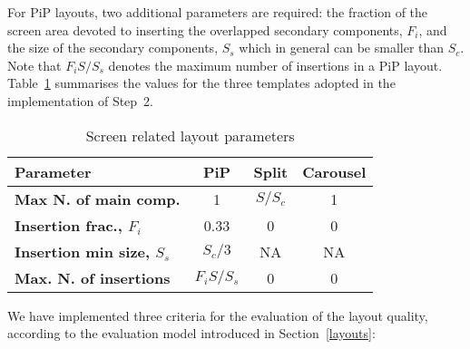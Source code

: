 For PiP layouts, two additional parameters are required: the fraction of the screen area devoted to inserting the overlapped secondary components, $F_i$, and the size of the secondary components, $S_s$ which in general can be smaller than $S_c$.
Note that $F_iS/S_s$ denotes the maximum number of insertions in a PiP layout. 
Table~\ref{tab:layoutparam} summarises the values for the three templates adopted in the implementation of Step~2.

\begin{table}
	\centering
	\caption {Screen related layout parameters}\label{tab:layoutparam}
	\begin{tabular}{||l|c|c|c||}
		\hline
		\textbf{Parameter} & \textbf{PiP} & \textbf{Split}  & \textbf{Carousel}\\
		
		\hline
		\textbf{Max N. of main comp.}  & 1 & $S/S_c$ & 1\\
		\hline  \textbf{Insertion frac., $F_i$}  & 0.33 & 0 & 0 \\
		\hline
		\textbf{Insertion min size, $S_s$}  & $S_c/3$ & NA & NA\\
		\hline
		\textbf{Max. N. of insertions}  & $F_i S/S_s$ & 0 & 0 \\
		\hline
	\end{tabular}
\end{table}

We have implemented three criteria for the evaluation of the layout quality, according to the evaluation model introduced in Section~\ref{layouts}:

